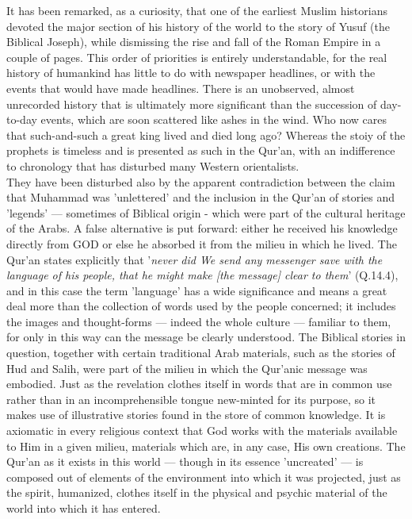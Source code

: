 \documentclass[11pt, b5paper, twoside]{book}
\begin{document}
It has been remarked, as a curiosity, that one of the earliest Muslim historians devoted the major 
section of his history of the world to the story of Yusuf (the Biblical Joseph), while dismissing the 
rise and fall of the Roman Empire in a couple of pages. This order of priorities is entirely 
understandable, for the real history of humankind has little to do with newspaper headlines, or with 
the events that would have made headlines. There is an unobserved, almost unrecorded history that is 
ultimately more significant than the succession of day-to-day events, which are soon scattered like 
ashes in the wind. Who now cares that such-and-such a great king lived and died long ago? Whereas the 
stoiy of the prophets is timeless and is presented as such in the Qur'an, with an indifference to 
chronology that has disturbed many Western orientalists. \\

They have been disturbed also by the apparent contradiction between the claim that Muhammad was 
'unlettered' and the inclusion in the Qur'an of stories and 'legends' --- sometimes of Biblical origin 
- which were part of the cultural heritage of the Arabs. A false alternative is put forward: either 
he received his knowledge directly from GOD or else he absorbed it from the milieu in which he lived. 
The Qur'an states explicitly that '\emph{never did We send any messenger save with the language of his 
people, that he might make [the message] clear to them}' (Q.14.4), and in this case the term 'language' 
has a wide significance and means a great deal more than the collection of words used by the people 
concerned; it includes the images and thought-forms --- indeed the whole culture --- familiar to them, 
for only in this way can the message be clearly understood. The Biblical stories in question, 
together with certain traditional Arab materials, such as the stories of Hud and Salih, were part of 
the milieu in which the Qur'anic message was embodied. Just as the revelation clothes itself in words 
that are in common use rather than in an incomprehensible tongue new-minted for its purpose, so it 
makes use of illustrative stories found in the store of common knowledge. It is axiomatic in every 
religious context that God works with the materials available to Him in a given milieu, materials 
which are, in any case, His own creations. The Qur'an as it exists in this world --- though in its 
essence 'uncreated' --- is composed out of elements of the environment into which it was projected, 
just as the spirit, humanized, clothes itself in the physical and psychic material of the world into 
which it has entered. \\
\end{document}

